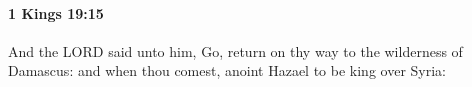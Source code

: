 
		\paragraph{1 Kings 19:15} %
			\label{1KINGS-19-15}

			And the LORD said unto him, Go, return on thy way to the wilderness of Damascus: and when thou comest, anoint Hazael to be king over Syria:



